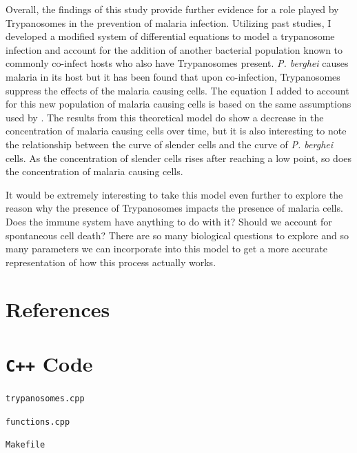 \documentclass[11pt]{article}
\begin{document}
	Overall, the findings of this study provide further evidence for a role played by Trypanosomes in the prevention of malaria infection. Utilizing past studies, I developed a modified system of differential equations to model a trypanosome infection and account for the addition of another bacterial population known to commonly co-infect hosts who also have Trypanosomes present. \textit{P. berghei} causes malaria in its host but it has been found that upon co-infection, Trypanosomes suppress the effects of the malaria causing cells. The equation I added to account for this new population of malaria causing cells is based on the same assumptions used by \citet{tyler2001limitation}. The results from this theoretical model do show a decrease in the concentration of malaria causing cells over time, but it is also interesting to note the relationship between the curve of slender cells and the curve of \textit{P. berghei} cells. As the concentration of slender cells rises after reaching a low point, so does the concentration of malaria causing cells.
	
	It would be extremely interesting  to take this model even further to explore the reason why the presence of Trypanosomes impacts the presence of malaria cells. Does the immune system have anything to do with it? Should we account for spontaneous cell death? There are so many biological questions to explore and so many parameters we can incorporate into this model to get a more accurate representation of how this process actually works.
	
	\newpage
	
	\section{References}
	\printbibliography[
	heading=none
	]
	\newpage
	
	\section{\texttt{C++} Code}
	
	\texttt{trypanosomes.cpp}
	
	\newpage
	\texttt{functions.cpp}
	
	\texttt{Makefile}
	
	
	
	
\end{document}
